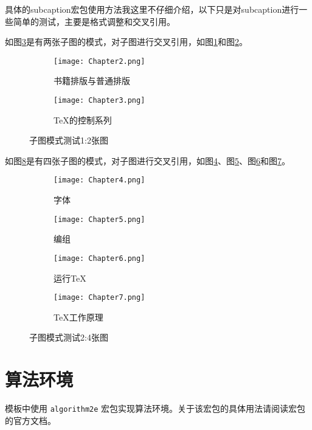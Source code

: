 具体的subcaption宏包使用方法我这里不仔细介绍，以下只是对subcaption进行一些简单的测试，主要是格式调整和交叉引用。

如图\ref{fig:subfig_test1}是有两张子图的模式，对子图进行交叉引用，如图\ref{subfig:1a}和图\ref{subfig:1b}。

\begin{figure}[htbp]
	\centering
	\begin{subfigure}[b]{.4\textwidth}
		\centering
		\texttt{[image: Chapter2.png]}
		\caption{书籍排版与普通排版}\label{subfig:1a}
	\end{subfigure}
	\quad
	\begin{subfigure}[b]{.4\textwidth}
		\centering
		\texttt{[image: Chapter3.png]}
		\caption{\TeX 的控制系列}\label{subfig:1b}
	\end{subfigure}
	\caption{子图模式测试1:2张图}\label{fig:subfig_test1}
\end{figure}

如图\ref{fig:subfig_test2}是有四张子图的模式，对子图进行交叉引用，如图\ref{subfig:2a}、图\ref{subfig:2b}、图\ref{subfig:2c}和图\ref{subfig:2d}。

\begin{figure}[htbp]
	\centering
	\begin{subfigure}[b]{.4\textwidth}
		\centering
		\texttt{[image: Chapter4.png]}
		\caption{字体}\label{subfig:2a}
	\end{subfigure}
	\begin{subfigure}[b]{.4\textwidth}
		\centering
		\texttt{[image: Chapter5.png]}
		\caption{编组}\label{subfig:2b}
	\end{subfigure}
	\begin{subfigure}[b]{.4\textwidth}
		\centering
		\texttt{[image: Chapter6.png]}
		\caption{运行\TeX}\label{subfig:2c}
	\end{subfigure}
	\begin{subfigure}[b]{.4\textwidth}
		\centering
		\texttt{[image: Chapter7.png]}
		\caption{\TeX 工作原理}\label{subfig:2d}
	\end{subfigure}
	\caption{子图模式测试2:4张图}\label{fig:subfig_test2}
\end{figure}

\section{算法环境}

模板中使用 \texttt{algorithm2e} 宏包实现算法环境。关于该宏包的具体用法请阅读宏包的官方文档。

